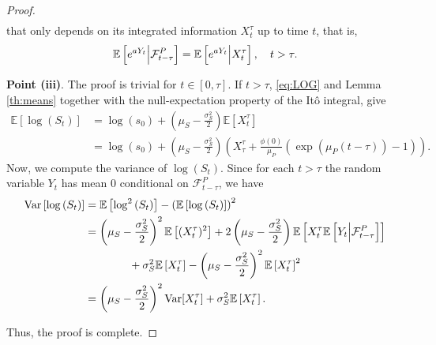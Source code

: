 \documentclass[12pt,centertags,reqno]{amsart}
\numberwithin{equation}{section} \makeatletter
\def \F {\mathcal F}
\newcommand{\esp}[2][\mathbb E] {#1\left[#2\right]}
\begin{document}
\begin{proof}
\begin{align*}
\end{align*}
that only depends on its integrated information $X_t^\tau$ up to time $t$, that is,  
$$
\esp{e^{aY_t}\Big{|}\F_{t-\tau}^{P}}=\esp{e^{aY_t}\Big{|}X_t^\tau}, \quad t > \tau.
$$

{\bf Point (iii)}. The proof is trivial for $t \in [0,\tau]$. If $t >\tau$, \eqref{eq:LOG} and Lemma \ref{th:means} together with the null-expectation property of the It\^o integral, %
give
\begin{align*}
\esp{\log \left(S_t\right)} & = \log \left(s_0\right) + \left(\mu_S-\frac{\sigma_S^2}{2}\right) \esp{X_t^\tau}\\
& = \log \left(s_0\right) + \left(\mu_S-\frac{\sigma_S^2}{2}\right)\left(X_\tau^\tau  +\frac{\phi(0)}{\mu_{P}}\left(\exp\left(\mu_{P}(t-\tau)\right) -1\right)\right).
\end{align*}
Now, we compute the variance of $\log \left(S_t\right)$. %
Since for each $t > \tau$ the random variable $Y_t $ has mean $0$ conditional on $\F_{t-\tau}^P$, we have
\begin{align*}
{\rm Var}\left[\log \left(S_t\right)\right] & = \esp{\log^2\left(S_t\right)} - \left(\esp{\log\left(S_t\right)}\right)^2\\
& = \left(\mu_S-\frac{\sigma_S^2}{2}\right)^2\esp{(X_t^\tau)^2}  + 2\left(\mu_S-\frac{\sigma_S^2}{2}\right)\esp{X_t^\tau \esp{Y_t\Big{|}\F_{t-\tau}^P}}\\
& \qquad \qquad + \sigma_S^2 \esp{X_t^\tau} - \left(\mu_S-\frac{\sigma_S^2}{2}\right)^2 \esp{X_t^\tau}^2\\
& = \left(\mu_S-\frac{\sigma_S^2}{2}\right)^2{\rm Var}[X_t^\tau]+ \sigma_S^2 \esp{X_t^\tau}.
\end{align*}

Thus, the proof is complete.
\end{proof}
\end{document}
